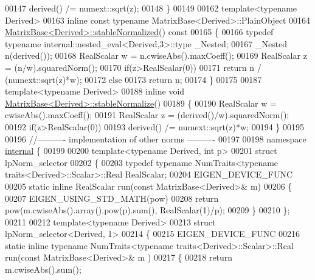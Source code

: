 \begin{DoxyCode}
00147     derived() /= numext::sqrt(z);
00148 \}
00149 
00162 \textcolor{keyword}{template}<\textcolor{keyword}{typename} Derived>
00163 \textcolor{keyword}{inline} \textcolor{keyword}{const} \textcolor{keyword}{typename} MatrixBase<Derived>::PlainObject
00164 \hyperlink{group___core___module_a399dca938633b9f8df5ec4beefeccec0}{MatrixBase<Derived>::stableNormalized}()\textcolor{keyword}{ const}
00165 \textcolor{keyword}{}\{
00166   \textcolor{keyword}{typedef} \textcolor{keyword}{typename} internal::nested\_eval<Derived,3>::type \_Nested;
00167   \_Nested n(derived());
00168   RealScalar w = n.cwiseAbs().maxCoeff();
00169   RealScalar z = (n/w).squaredNorm();
00170   \textcolor{keywordflow}{if}(z>RealScalar(0))
00171     \textcolor{keywordflow}{return} n / (numext::sqrt(z)*w);
00172   \textcolor{keywordflow}{else}
00173     \textcolor{keywordflow}{return} n;
00174 \}
00175 
00187 \textcolor{keyword}{template}<\textcolor{keyword}{typename} Derived>
00188 \textcolor{keyword}{inline} \textcolor{keywordtype}{void} \hyperlink{group___core___module_a0b1443fa322615379557ade3399a3c3c}{MatrixBase<Derived>::stableNormalize}()
00189 \{
00190   RealScalar w = cwiseAbs().maxCoeff();
00191   RealScalar z = (derived()/w).squaredNorm();
00192   \textcolor{keywordflow}{if}(z>RealScalar(0))
00193     derived() /= numext::sqrt(z)*w;
00194 \}
00195 
00196 \textcolor{comment}{//---------- implementation of other norms ----------}
00197 
00198 \textcolor{keyword}{namespace }\hyperlink{namespaceinternal}{internal} \{
00199 
00200 \textcolor{keyword}{template}<\textcolor{keyword}{typename} Derived, \textcolor{keywordtype}{int} p>
00201 \textcolor{keyword}{struct }lpNorm\_selector
00202 \{
00203   \textcolor{keyword}{typedef} \textcolor{keyword}{typename} NumTraits<typename traits<Derived>::Scalar>::Real RealScalar;
00204   EIGEN\_DEVICE\_FUNC
00205   \textcolor{keyword}{static} \textcolor{keyword}{inline} RealScalar run(\textcolor{keyword}{const} MatrixBase<Derived>& m)
00206   \{
00207     EIGEN\_USING\_STD\_MATH(pow)
00208     \textcolor{keywordflow}{return} pow(m.cwiseAbs().array().pow(p).sum(), RealScalar(1)/p);
00209   \}
00210 \};
00211 
00212 \textcolor{keyword}{template}<\textcolor{keyword}{typename} Derived>
00213 \textcolor{keyword}{struct }lpNorm\_selector<Derived, 1>
00214 \{
00215   EIGEN\_DEVICE\_FUNC
00216   \textcolor{keyword}{static} \textcolor{keyword}{inline} \textcolor{keyword}{typename} NumTraits<typename traits<Derived>::Scalar>::Real run(\textcolor{keyword}{const} MatrixBase<Derived>& m
      )
00217   \{
00218     \textcolor{keywordflow}{return} m.cwiseAbs().sum();

\end{DoxyCode}
